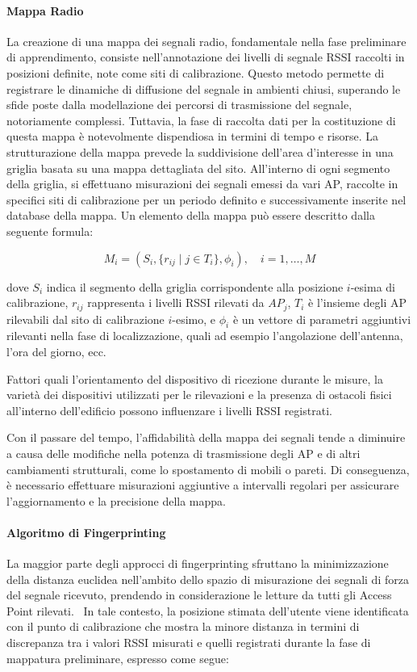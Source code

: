 \paragraph{Mappa Radio}
La creazione di una mappa dei segnali radio, fondamentale nella fase preliminare di apprendimento, consiste nell'annotazione dei livelli di segnale RSSI raccolti in posizioni definite, note come siti di calibrazione. Questo metodo permette di registrare le dinamiche di diffusione del segnale in ambienti chiusi, superando le sfide poste dalla modellazione dei percorsi di trasmissione del segnale, notoriamente complessi. Tuttavia, la fase di raccolta dati per la costituzione di questa mappa è notevolmente dispendiosa in termini di tempo e risorse. La strutturazione della mappa prevede la suddivisione dell'area d'interesse in una griglia basata su una mappa dettagliata del sito. All'interno di ogni segmento della griglia, si effettuano misurazioni dei segnali emessi da vari AP, raccolte in specifici siti di calibrazione per un periodo definito e successivamente inserite nel database della mappa. Un elemento della mappa può essere descritto dalla seguente formula:

\begin{equation}
    M_i = \left(S_i, \{r_{ij} \mid j \in T_i\}, \phi_i\right), \quad i = 1, \ldots, M
\end{equation}

\noindent dove $S_i$ indica il segmento della griglia corrispondente alla posizione $i$-esima di calibrazione, $r_{ij}$ rappresenta i livelli RSSI rilevati da $AP_j$, $T_i$ è l'insieme degli AP rilevabili dal sito di calibrazione $i$-esimo, e $\phi_i$ è un vettore di parametri aggiuntivi rilevanti nella fase di localizzazione, quali ad esempio l'angolazione dell'antenna, l'ora del giorno, ecc.

Fattori quali l'orientamento del dispositivo di ricezione durante le misure, la varietà dei dispositivi utilizzati per le rilevazioni e la presenza di ostacoli fisici all'interno dell'edificio possono influenzare i livelli RSSI registrati.

Con il passare del tempo, l'affidabilità della mappa dei segnali tende a diminuire a causa delle modifiche nella potenza di trasmissione degli AP e di altri cambiamenti strutturali, come lo spostamento di mobili o pareti. Di conseguenza, è necessario effettuare misurazioni aggiuntive a intervalli regolari per assicurare l'aggiornamento e la precisione della mappa.

\paragraph{Algoritmo di Fingerprinting}
La maggior parte degli approcci di fingerprinting sfruttano la minimizzazione della distanza euclidea nell'ambito dello spazio di misurazione dei segnali di forza del segnale ricevuto, prendendo in considerazione le letture da tutti gli Access Point rilevati.~\cite{Seco2009} In tale contesto, la posizione stimata dell'utente viene identificata con il punto di calibrazione che mostra la minore distanza in termini di discrepanza tra i valori RSSI misurati e quelli registrati durante la fase di mappatura preliminare, espresso come segue:

